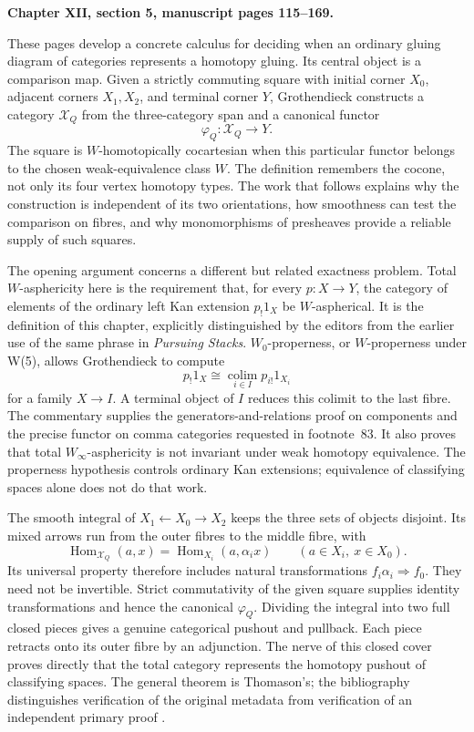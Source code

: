 \noindent\textbf{Chapter XII, section 5, manuscript pages 115--169.}
\medskip

These pages develop a concrete calculus for deciding when an ordinary gluing diagram of categories represents a homotopy gluing. Its central object is a comparison map. Given a strictly commuting square with initial corner $X_0$, adjacent corners $X_1,X_2$, and terminal corner $Y$, Grothendieck constructs a category $\mathcal X_Q$ from the three-category span and a canonical functor
\[
                    \varphi_Q:\mathcal X_Q\longrightarrow Y.
\]
The square is $W$-homotopically cocartesian when this particular functor belongs to the chosen weak-equivalence class $W$. The definition remembers the cocone, not only its four vertex homotopy types. The work that follows explains why the construction is independent of its two orientations, how smoothness can test the comparison on fibres, and why monomorphisms of presheaves provide a reliable supply of such squares.

The opening argument concerns a different but related exactness problem. Total $W$-asphericity here is the requirement that, for every $p:X\to Y$, the category of elements of the ordinary left Kan extension $p_!1_X$ be $W$-aspherical. It is the definition of this chapter, explicitly distinguished by the editors from the earlier use of the same phrase in \emph{Pursuing Stacks}. $W_0$-properness, or $W$-properness under W(5), allows Grothendieck to compute
\[
 p_!1_X\cong\operatorname*{colim}_{i\in I}p_{i!}1_{X_i}
\]
for a family $X\to I$. A terminal object of $I$ reduces this colimit to the last fibre. The commentary supplies the generators-and-relations proof on components and the precise functor on comma categories requested in footnote~83. It also proves that total $W_\infty$-asphericity is not invariant under weak homotopy equivalence. The properness hypothesis controls ordinary Kan extensions; equivalence of classifying spaces alone does not do that work.

The smooth integral of $X_1\leftarrow X_0\to X_2$ keeps the three sets of objects disjoint. Its mixed arrows run from the outer fibres to the middle fibre, with
\[
 \operatorname{Hom}_{\mathcal X_Q}(a,x)
       =\operatorname{Hom}_{X_i}(a,\alpha_i x)
       \qquad(a\in X_i,\ x\in X_0).
\]
Its universal property therefore includes natural transformations $f_i\alpha_i\Rightarrow f_0$. They need not be invertible. Strict commutativity of the given square supplies identity transformations and hence the canonical $\varphi_Q$. Dividing the integral into two full closed pieces gives a genuine categorical pushout and pullback. Each piece retracts onto its outer fibre by an adjunction. The nerve of this closed cover proves directly that the total category represents the homotopy pushout of classifying spaces. The general theorem is Thomason's; the bibliography distinguishes verification of the original metadata from verification of an independent primary proof \citep{Thomason1979,Cegarra2020}.

